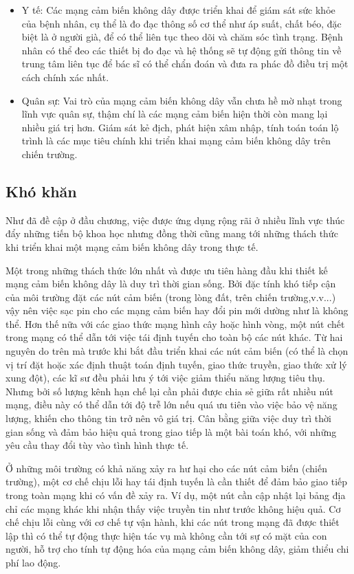 \begin{itemize}
\item Y tế: Các mạng cảm biến không dây được triển khai để giám sát sức khỏe của bệnh nhân, cụ thể là đo đạc thông số cơ thể như áp suất, chất béo, đặc biệt là ở người già, để có thể liên tục theo dõi và chăm sóc tình trạng. Bệnh nhân có thể đeo các thiết bị đo đạc và hệ thống sẽ tự động gửi thông tin về trung tâm liên tục để bác sĩ có thể chẩn đoán và đưa ra phác đồ điều trị một cách chính xác nhất.
\item Quân sự: Vai trò của mạng cảm biến không dây vẫn chưa hề mờ nhạt trong lĩnh vực quân sự, thậm chí là các mạng cảm biến hiện thời còn mang lại nhiều giá trị hơn. Giám sát kẻ địch, phát hiện xâm nhập, tính toán toán lộ trình là các mục tiêu chính khi triển khai mạng cảm biến không dây trên chiến trường.
\end{itemize}

\subsection{Khó khăn}
Như đã đề cập ở đầu chương, việc được ứng dụng rộng rãi ở nhiều lĩnh vực thúc đẩy những tiến bộ khoa học nhưng đồng thời cũng mang tới những thách thức khi triển khai một mạng cảm biến không dây trong thực tế. \cite{eisa2013challenges}


Một trong những thách thức lớn nhất và được ưu tiên hàng đầu khi thiết kế mạng cảm biến không dây là duy trì thời gian sống. Bởi đặc tính khó tiếp cận của môi trường đặt các nút cảm biến (trong lòng đất, trên chiến trường,v.v...) vậy nên việc sạc pin cho các mạng cảm biến hay đổi pin mới dường như là không thể. Hơn thế nữa với các giao thức mạng hình cây hoặc hình vòng, một nút chết trong mạng có thể dẫn tới việc tái định tuyến cho toàn bộ các nút khác. Từ hai nguyên do trên mà trước khi bắt đầu triển khai các nút cảm biến (có thể là chọn vị trí đặt hoặc xác định thuật toán định tuyến, giao thức truyền, giao thức xử lý xung đột), các kĩ sư đều phải lưu ý tới việc giảm thiểu năng lượng tiêu thụ. Nhưng bởi số lượng kênh hạn chế lại cần phải được chia sẻ giữa rất nhiều nút mạng, điều này có thể dẫn tới độ trễ lớn nếu quá ưu tiên vào việc bảo vệ năng lượng, khiến cho thông tin trở nên vô giá trị. Cân bằng giữa việc duy trì thời gian sống và đảm bảo hiệu quả trong giao tiếp là một bài toán khó, với những yêu cầu thay đổi tùy vào tình hình thực tế.


Ở những môi trường có khả năng xảy ra hư hại cho các nút cảm biến (chiến trường), một cơ chế chịu lỗi hay tái định tuyến là cần thiết để đảm bảo giao tiếp trong toàn mạng khi có vấn đề xảy ra. Ví dụ, một nút cần cập nhật lại bảng địa chỉ các mạng khác khi nhận thấy việc truyền tin như trước không hiệu quả. Cơ chế chịu lỗi cùng với cơ chế tự vận hành, khi các nút trong mạng đã được thiết lập thì có thể tự động thực hiện tác vụ mà không cần tới sự có mặt của con người, hỗ trợ cho tính tự động hóa của mạng cảm biến không dây, giảm thiểu chi phí lao động.
 

